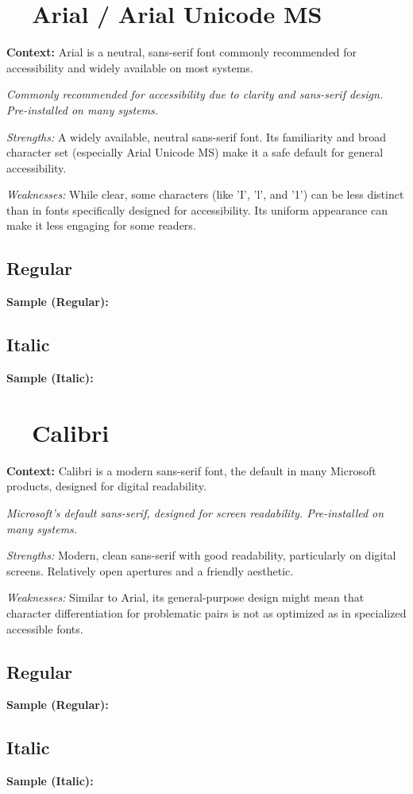 \pagebreak
\section{~~Arial / Arial Unicode MS}\label{app5:sec:arial}
\noindent
\textbf{Context:} Arial is a neutral, sans-serif font commonly recommended for accessibility and widely available on most systems.

\emph{Commonly recommended for accessibility due to clarity and sans-serif design. Pre-installed on many systems.}
\begin{raggedright}
	\emph{Strengths:} A widely available, neutral sans-serif font. Its familiarity and broad character set (especially Arial Unicode MS) make it a safe default for general accessibility.

	\emph{Weaknesses:} While clear, some characters (like 'I', 'l', and '1') can be less distinct than in fonts specifically designed for accessibility. Its uniform appearance can make it less engaging for some readers.

	\subsection{Regular}
	\noindent\textbf{Sample (Regular):}
	\FontSample{\arialfont}

	\subsection{Italic}
	\noindent\textbf{Sample (Italic):}
	\FontSample{{\arialfont\itshape}}
\end{raggedright}


\pagebreak
\section{~~Calibri}\label{app5:sec:calibri}
\noindent
\textbf{Context:} Calibri is a modern sans-serif font, the default in many Microsoft products, designed for digital readability.

\emph{Microsoft’s default sans-serif, designed for screen readability. Pre-installed on many systems.}
\begin{raggedright}
	\emph{Strengths:} Modern, clean sans-serif with good readability, particularly on digital screens. Relatively open apertures and a friendly aesthetic.

	\emph{Weaknesses:} Similar to Arial, its general-purpose design might mean that character differentiation for problematic pairs is not as optimized as in specialized accessible fonts.

	\subsection{Regular}
	\noindent\textbf{Sample (Regular):}
	\FontSample{\calibrifont}

	\subsection{Italic}
	\noindent\textbf{Sample (Italic):}
	\FontSample{{\calibrifont\itshape}}
\end{raggedright}


